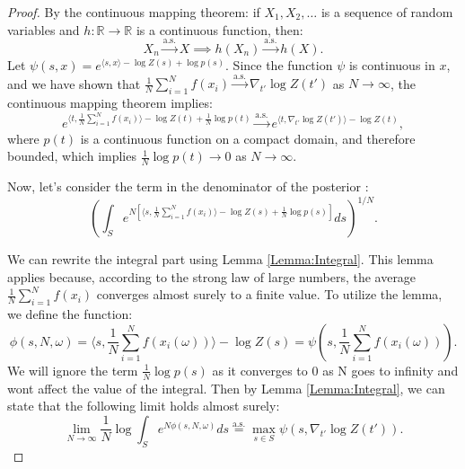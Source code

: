\documentclass{article}
\theoremstyle{plain}
\theoremstyle{definition}
\theoremstyle{remark}
\begin{document}
\begin{proof}
By the continuous mapping theorem: if $X_1, X_2, \ldots$ is a sequence of random variables and $h: \mathbb{R} \to \mathbb{R}$ is a continuous function, then:
\begin{equation}
X_n \xrightarrow{\text{a.s.}} X \implies h(X_n) \xrightarrow{\text{a.s.}} h(X).
\end{equation}
Let $\psi(s, x) = e^{\langle s, x \rangle - \log Z(s) + \log p(s)}$. Since the function $\psi$ is continuous in $x$, and we have shown that $\frac{1}{N} \sum_{i=1}^N f(x_i) \xrightarrow{\text{a.s.}} \nabla_{t'} \log Z(t')$ as $N \to \infty$, the continuous mapping theorem implies:
\begin{equation}
 e^{\langle t, \frac{1}{N} \sum_{i=1}^N f(x_i) \rangle - \log Z(t) + \frac{1}{N}\log p(t)} \xrightarrow{\text{a.s.}} e^{\langle t, \nabla_{t'} \log Z(t') \rangle - \log Z(t)},
\end{equation}
where $p(t)$ is a continuous function on a compact domain, and therefore bounded, which implies $\frac{1}{N} \log p(t) \to 0$ as $N \to \infty$.

Now, let's consider the term in the denominator of the posterior :
\begin{equation}
\left( \int_S e^{N\left[\langle s, \frac{1}{N} \sum_{i=1}^N f(x_i) \rangle - \log Z(s) + \frac{1}{N} \log p(s)\right]} ds \right)^{1/N}.
\end{equation}

We can rewrite the integral part using Lemma \ref{Lemma:Integral}. This lemma applies because, according to the strong law of large numbers, the average $\frac{1}{N} \sum_{i=1}^N f(x_i)$ converges almost surely to a finite value. To utilize the lemma, we define the function:
\begin{equation}
\phi(s, N, \omega) = \langle s, \frac{1}{N} \sum_{i=1}^N f(x_i(\omega)) \rangle - \log Z(s) = \psi\left(s, \frac{1}{N} \sum_{i=1}^N f(x_i(\omega))\right).
\end{equation}
We will ignore the term $\frac{1}{N} \log p(s)$ as it converges to 0 as N goes to infinity and wont affect the value of the integral.
Then by Lemma \ref{Lemma:Integral}, we can state that the following limit holds almost surely:
\begin{equation}
\lim_{N \to \infty} \frac{1}{N} \log \int_S e^{N \phi(s, N, \omega)} ds \overset{\text{a.s.}}{=} \max_{s \in S} \psi(s, \nabla_{t'} \log Z(t')).
\end{equation}



\end{proof}
\end{document}
